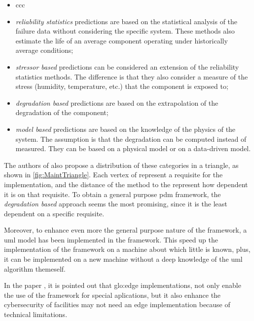 \begin{itemize}
    \item ccc%
    \item \emph{reliability statistics} predictions are based on the statistical analysis of the failure data without considering the specific system. These methods also estimate the life
    of an average component operating under historically average conditions;
    \item \emph{stressor based} predictions can be considered an extension of the reliability statistics methods. The difference is that they also consider a measure of the stress (humidity, temperature, etc.) that the component is exposed to;
    \item \emph{degradation based} predictions are based on the extrapolation of the degradation of the component;
    \item \emph{model based} predictions are based on the knowledge of the physics of the system. The assumption is that the degradation can be computed instead of measured. They can be based on a physical model or on a data-driven model.
\end{itemize}


The authors of \cite{Maintenance_cat} also propose a distribution of these categories in a triangle, as shown in \autoref{fig:MaintTriangle}. Each vertex of represent a requisite for the implementation, and the distance of the method to the represent how dependent it is on that requisite. To obtain a general purpose \gls{pdm} framework, the \emph{degradation based} approach seems the most promising, since it is the least dependent on a specific requisite.

Moreover, to enhance even more the general purpose nature of the framework, a \gls{uml} model has been implemented in the framework. This speed up the implementation of the framework on a machine about which little is known, plus, it can be implemented on a new machine without a deep knowledge of the \gls{uml} algorithm themeself.

In the paper \cite{GridPredictMaintenance}, it is pointed out that \gls{glo:edge} implementations, not only enable the use of the framework for special aplications, but it also enhance the cybersecurity of facilities may not need an edge implementation because of technical limitations.